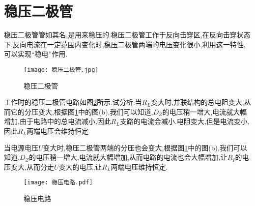 \section{\K 稳压二极管}
\Par 稳压二极管管如其名,是用来稳压的.稳压二极管工作于反向击穿区,在反向击穿状态下,反向电流在一定范围内变化时,稳压二极管两端的电压变化很小,利用这一特性,可以实现“稳电”作用.

\begin{figure}[htbp]
	\centering
	\texttt{[image: 稳压二极管.jpg]}
	\caption{稳压二极管}
	\label{fig:稳压二极管}
\end{figure}

\Par 工作时的稳压二极管电路如图\ref{fig:稳压电路}所示.试分析:当$R_L$变大时,并联结构的总电阻变大,从而它的分压变大,根据图\ref{fig:稳压二极管}中的图(b),我们可以知道,$D_Z$的电压稍一增大,电流就大幅增加,由于电路中的总电流减小,因此$R_L$支路的电流会减小.电阻变大,但是电流变小,因此$R_L$两端电压会维持恒定

\Par 当电源电压$U$变大时,稳压二极管两端的分压也会变大,根据图\ref{fig:稳压二极管}中的图(b),我们可以知道,$D_Z$的电压稍一增大,电流就大幅增加,从而电路的电流也会大幅增加,让$R_I$的电压变大,从而分走$U$变大的电压,让$R_L$两端电压维持恒定.

\begin{figure}[htbp]
	\centering
	\texttt{[image: 稳压电路.pdf]}
	\caption{稳压电路}
	\label{fig:稳压电路}
\end{figure}

